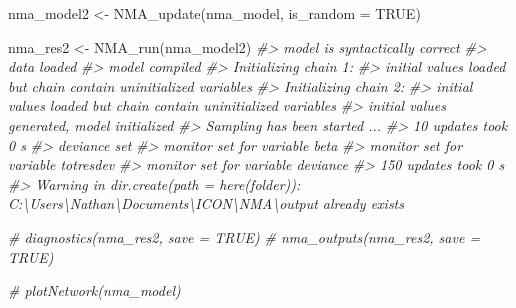 \documentclass[
]{article}
\newenvironment{Shaded}{\begin{snugshade}}{\end{snugshade}}
\newcommand{\AttributeTok}[1]{\textcolor[rgb]{0.77,0.63,0.00}{#1}}
\newcommand{\CommentTok}[1]{\textcolor[rgb]{0.56,0.35,0.01}{\textit{#1}}}
\newcommand{\ConstantTok}[1]{\textcolor[rgb]{0.00,0.00,0.00}{#1}}
\newcommand{\FunctionTok}[1]{\textcolor[rgb]{0.00,0.00,0.00}{#1}}
\newcommand{\NormalTok}[1]{#1}
\newcommand{\OtherTok}[1]{\textcolor[rgb]{0.56,0.35,0.01}{#1}}
\begin{document}
\begin{Shaded}
\begin{Highlighting}[]
\NormalTok{nma\_model2 }\OtherTok{\textless{}{-}}
  \FunctionTok{NMA\_update}\NormalTok{(nma\_model,}
             \AttributeTok{is\_random =} \ConstantTok{TRUE}\NormalTok{)}

\NormalTok{nma\_res2 }\OtherTok{\textless{}{-}} \FunctionTok{NMA\_run}\NormalTok{(nma\_model2)}
\CommentTok{\#\textgreater{} model is syntactically correct}
\CommentTok{\#\textgreater{} data loaded}
\CommentTok{\#\textgreater{} model compiled}
\CommentTok{\#\textgreater{} Initializing chain 1:}
\CommentTok{\#\textgreater{} initial values loaded but chain contain uninitialized variables}
\CommentTok{\#\textgreater{} Initializing chain 2:}
\CommentTok{\#\textgreater{} initial values loaded but chain contain uninitialized variables}
\CommentTok{\#\textgreater{} initial values generated, model initialized}
\CommentTok{\#\textgreater{} Sampling has been started ...}
\CommentTok{\#\textgreater{} 10 updates took 0 s}
\CommentTok{\#\textgreater{} deviance set}
\CommentTok{\#\textgreater{} monitor set for variable \textquotesingle{}beta\textquotesingle{}}
\CommentTok{\#\textgreater{} monitor set for variable \textquotesingle{}totresdev\textquotesingle{}}
\CommentTok{\#\textgreater{} monitor set for variable \textquotesingle{}deviance\textquotesingle{}}
\CommentTok{\#\textgreater{} 150 updates took 0 s}
\CommentTok{\#\textgreater{} Warning in dir.create(path = here(folder)): \textquotesingle{}C:\textbackslash{}Users\textbackslash{}Nathan\textbackslash{}Documents\textbackslash{}ICON\textbackslash{}NMA\textbackslash{}output\textquotesingle{} already exists}

\CommentTok{\# diagnostics(nma\_res2, save = TRUE)}
\CommentTok{\# nma\_outputs(nma\_res2, save = TRUE)}

\CommentTok{\# plotNetwork(nma\_model)}
\end{Highlighting}
\end{Shaded}
\end{document}
